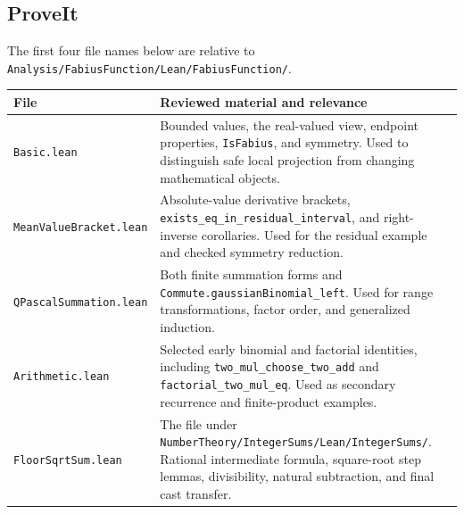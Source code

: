 \documentclass[11pt,a4paper]{article}
\newcommand{\code}[1]{\nolinkurl{#1}}
\theoremstyle{definition}
\theoremstyle{remark}
\numberwithin{equation}{section}
\begin{document}
\subsection*{ProveIt}
The first four file names below are relative to
\code{Analysis/FabiusFunction/Lean/FabiusFunction/}.
\begin{longtable}{@{}P{.24\linewidth}P{.70\linewidth}@{}}
\toprule
File & Reviewed material and relevance \\
\midrule
\endhead
\code{Basic.lean} & Bounded values, the real-valued view, endpoint properties, \code{IsFabius}, and symmetry. Used to distinguish safe local projection from changing mathematical objects.\cite{p-basic} \\
\addlinespace
\code{MeanValueBracket.lean} & Absolute-value derivative brackets, \code{exists_eq_in_residual_interval}, and right-inverse corollaries. Used for the residual example and checked symmetry reduction.\cite{p-mean} \\
\addlinespace
\code{QPascalSummation.lean} & Both finite summation forms and \code{Commute.gaussianBinomial_left}. Used for range transformations, factor order, and generalized induction.\cite{p-qpascal} \\
\addlinespace
\code{Arithmetic.lean} & Selected early binomial and factorial identities, including \code{two_mul_choose_two_add} and \code{factorial_two_mul_eq}. Used as secondary recurrence and finite-product examples.\cite{p-arithmetic} \\
\addlinespace
\code{FloorSqrtSum.lean} & The file under \code{NumberTheory/IntegerSums/Lean/IntegerSums/}. Rational intermediate formula, square-root step lemmas, divisibility, natural subtraction, and final cast transfer.\cite{p-floor} \\
\bottomrule
\end{longtable}
\end{document}
